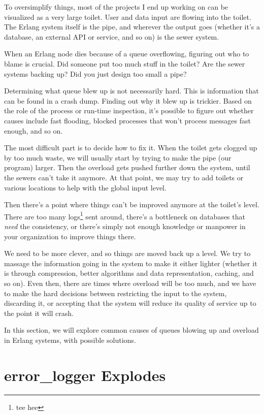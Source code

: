\documentclass[11pt, oneside]{book}   	%
\begin{document}
To oversimplify things, most of the projects I end up working on can be visualized as a very large toilet. User and data input are flowing into the toilet. The Erlang system itself is the pipe, and wherever the output goes (whether it's a database, an external API or service, and so on) is the sewer system.

When an Erlang node dies because of a queue overflowing, figuring out who to blame is crucial. Did someone put too much stuff in the toilet? Are the sewer systems backing up? Did you just design too small a pipe?

Determining what queue blew up is not necessarily hard. This is information that can be found in a crash dump. Finding out why it blew up is trickier. Based on the role of the process or run-time inspection, it's possible to figure out whether causes include fast flooding, blocked processes that won't process messages fast enough, and so on.

The most difficult part is to decide how to fix it. When the toilet gets clogged up by too much waste, we will usually start by trying to make the pipe (our program) larger. Then the overload gets pushed further down the system, until the sewers can't take it anymore. At that point, we may try to add toilets or various locations to help with the global input level.

Then there's a point where things can't be improved anymore at the toilet's level. There are too many logs\footnote{tee hee} sent around, there's a bottleneck on databases that \emph{need} the consistency, or there's simply not enough knowledge or manpower in your organization to improve things there.

We need to be more clever, and so things are moved back up a level. We try to massage the information going in the system to make it either lighter (whether it is through compression, better algorithms and data representation, caching, and so on). Even then, there are times where overload will be too much, and we have to make the hard decisions between restricting the input to the system, discarding it, or accepting that the system will reduce its quality of service up to the point it will crash.

In this section, we will explore common causes of queues blowing up and overload in Erlang systems, with possible solutions.

\section{error\_logger Explodes}
\end{document}
